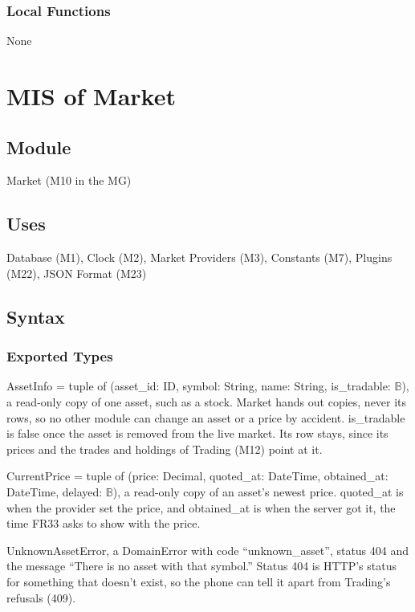 \documentclass[12pt, titlepage]{article}
\begin{document}
\subsubsection{Local Functions}

None

\newpage

\section{MIS of Market} \label{MisMarket}

\subsection{Module}

Market (M10 in the MG)

\subsection{Uses}

Database (M1), Clock (M2), Market Providers (M3), Constants (M7), Plugins (M22),
JSON Format (M23)

\subsection{Syntax}

\subsubsection{Exported Types}

\noindent AssetInfo = tuple of (asset\_id: ID, symbol: String, name: String,
is\_tradable: $\mathbb{B}$), a read-only copy of one asset, such as a stock.
Market hands out copies, never its rows, so no other module can change an
asset or a price by accident. is\_tradable is false once the asset is removed
from the live market. Its row stays, since its prices and the trades and
holdings of Trading (M12) point at it.

\medskip
\noindent CurrentPrice = tuple of (price: Decimal, quoted\_at: DateTime,
obtained\_at: DateTime, delayed: $\mathbb{B}$), a read-only copy of an asset's
newest price. quoted\_at is when the provider set the price, and obtained\_at
is when the server got it, the time FR33 asks to show with the price.

\medskip
\noindent UnknownAssetError, a DomainError with code ``unknown\_asset'', status
404 and the message ``There is no asset with that symbol.'' Status 404 is
HTTP's status for something that doesn't exist, so the phone can tell it apart
from Trading's refusals (409).
\end{document}
